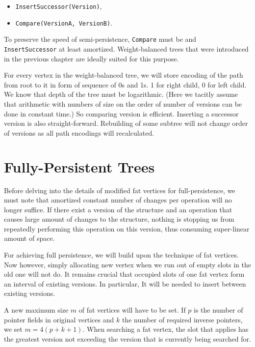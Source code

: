 \begin{itemize}
	\item \texttt{InsertSuccessor(Version)},
	\item \texttt{Compare(VersionA, VersionB)}.
\end{itemize}

To preserve the speed of semi-persistence, \texttt{Compare} must be  and \texttt{InsertSuccessor}  at least amortized. Weight-balanced trees that were introduced in the previous chapter are ideally suited for this purpose.

For every vertex in the weight-balanced tree, we will store encoding of the path from root to it in form of sequence of 0s and 1s. 1 for right child, 0 for left child. We know that depth of the tree must be logarithmic. (Here we tacitly assume that arithmetic with numbers of size on the order of number of versions can be done in constant time.) So comparing version is efficient. Inserting a successor version is also straight-forward. Rebuilding of some subtree will not change order of versions as all path encodings will recalculated.

\section{Fully-Persistent Trees}

Before delving into the details of modified fat vertices for full-persistence, we must note that amortized constant number of changes per operation will no longer suffice. If there exist a version of the structure and an operation that causes large amount of changes to the structure, nothing is stopping us from repeatedly performing this operation on this version, thus consuming super-linear amount of space.

For achieving full persistence, we will build upon the technique of fat vertices. Now however, simply allocating new vertex when we run out of empty slots in the old one will not do. It remains crucial that occupied slots of one fat vertex form an interval of existing versions. In particular, It will be needed to insert between existing versions.

A new maximum size $m$ of fat vertices will have to be set. If $p$ is the number of pointer fields in original vertices and $k$ the number of required inverse pointers, we set $m = 4(p+k+1)$.
When searching a fat vertex, the slot that applies has the greatest version not exceeding the version that is currently being searched for.


